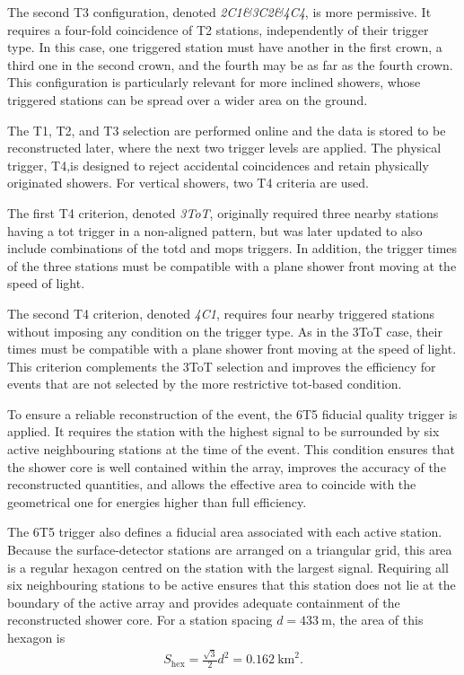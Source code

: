 \documentclass[main.tex]{subfiles}
\begin{document}
The second T3 configuration, denoted \textit{2C1\&3C2\&4C4}, is more permissive.
It requires a four-fold coincidence of T2 stations, independently of their trigger type.
In this case, one triggered station must have another in the first crown, a third one in the second crown, and the fourth may be as far as the fourth crown.
This configuration is particularly relevant for more inclined showers, whose triggered stations can be spread over a wider area on the ground.

The T1, T2, and T3 selection are performed online and the data is stored to be reconstructed later, where the next two trigger levels are applied.
The physical trigger, T4,is designed to reject accidental coincidences and retain physically originated showers.
For vertical showers, two T4 criteria are used.

The first T4 criterion, denoted \textit{3ToT}, originally required three nearby stations having a \gls{tot} trigger in a non-aligned pattern, but was later updated to also include combinations of the \gls{totd} and \gls{mops} triggers.
In addition, the trigger times of the three stations must be compatible with a plane shower front moving at the speed of light.

The second T4 criterion, denoted \textit{4C1}, requires four nearby triggered stations without imposing any condition on the trigger type.
As in the 3ToT case, their times must be compatible with a plane shower front moving at the speed of light.
This criterion complements the 3ToT selection and improves the efficiency for events that are not selected by the more restrictive \gls{tot}-based condition.

To ensure a reliable reconstruction of the event, the 6T5 fiducial quality trigger is applied.
It requires the station with the highest signal to be surrounded by six active neighbouring stations at the time of the event.
This condition ensures that the shower core is well contained within the array, improves the accuracy of the reconstructed quantities, and allows the effective area to coincide with the geometrical one for energies higher than full efficiency.

The 6T5 trigger also defines a fiducial area associated with each active station.
Because the surface-detector stations are arranged on a triangular grid, this area is a regular hexagon centred on the station with the largest signal.
Requiring all six neighbouring stations to be active ensures that this station does not lie at the boundary of the active array and provides adequate containment of the reconstructed shower core.
For a station spacing $d=\SI{433}{\m}$, the area of this hexagon is
\begin{align}
    S_{\mathrm{hex}}
    =\frac{\sqrt{3}}{2}d^2
    =\SI{0.162}{\km\squared}.
    \label{eq:6T5_area}
\end{align}
\end{document}
